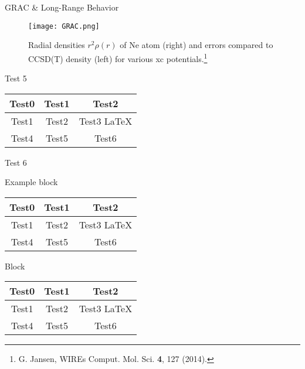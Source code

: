 \documentclass{beamer}
\begin{document}
        \begin{frame}{GRAC \& Long-Range Behavior}
            \begin{figure}
            \centering
            \texttt{[image: GRAC.png]}
            \caption{Radial densities $r^2\rho(r)$ of Ne atom (right) and errors compared to CCSD(T) density (left) for various xc potentials.\footnote{G. Jansen, WIREs Comput. Mol. Sci. \textbf{4}, 127 (2014).}} 
            \end{figure}
        \end{frame}



        \begin{frame}{Test 5}

            \begin{tabular}{|c|c|c|}
            \hline
            \textbf{Test0} & \textbf{Test1} & \textbf{Test2} \\
            \hline
            Test1 & Test2 & Test3 \LaTeX  \\
            \hline
            Test4 & Test5& Test6\\
            \hline
            \end{tabular}
            
        \end{frame}

        \begin{frame}{Test 6}

            \begin{exampleblock}{Example block}
                \smallskip 

                \begin{tabular}{|c|c|c|}
                \hline
                \textbf{Test0} & \textbf{Test1} & \textbf{Test2} \\
                \hline
                Test1 & Test2 & Test3 \LaTeX  \\
                \hline
                Test4 & Test5& Test6\\
                \hline
                \end{tabular}
            \end{exampleblock}

            \begin{block}{Block}
                \smallskip 

                \begin{tabular}{|c|c|c|}
                \hline
                \textbf{Test0} & \textbf{Test1} & \textbf{Test2} \\
                \hline
                Test1 & Test2 & Test3 \LaTeX  \\
                \hline
                Test4 & Test5& Test6\\
                \hline
                \end{tabular}
            \end{block}
        \end{frame}
\end{document}
